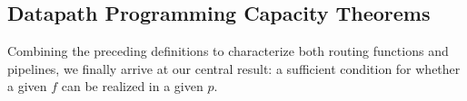 





%
%
%
%
\subsection{Datapath Programming Capacity Theorems}
Combining the preceding definitions to characterize both routing functions and pipelines, we finally arrive at our central result: a sufficient condition for whether a given $f$ can be realized in a given $p$.

